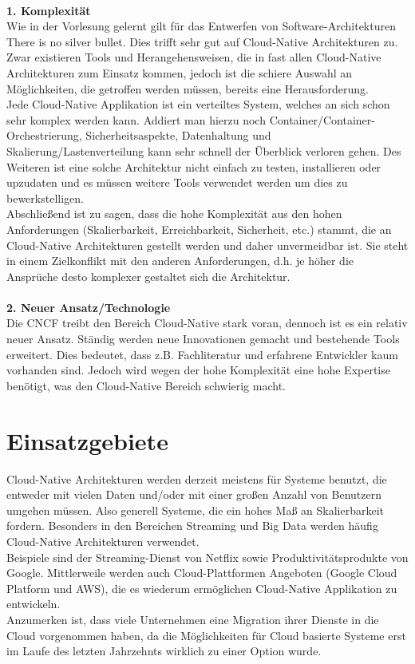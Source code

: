 \\
\textbf{1. Komplexität}\\
Wie in der Vorlesung gelernt gilt für das Entwerfen von Software-Architekturen \glqq There is no silver bullet\grqq{}. Dies trifft sehr gut auf Cloud-Native Architekturen zu. Zwar existieren Tools und Herangehensweisen, die in fast allen Cloud-Native Architekturen zum Einsatz kommen, jedoch ist die schiere Auswahl an Möglichkeiten, die getroffen werden müssen, bereits eine Herausforderung.\\ 
Jede Cloud-Native Applikation ist ein verteiltes System, welches an sich schon sehr komplex werden kann. Addiert man hierzu noch Container/Container-Orchestrierung, Sicherheitsaspekte, Datenhaltung und Skalierung/Lastenverteilung kann sehr schnell der Überblick verloren gehen. Des Weiteren ist eine solche Architektur nicht einfach zu testen, installieren oder upzudaten und es müssen weitere Tools verwendet werden um dies zu bewerkstelligen.\\
Abschließend ist zu sagen, dass die hohe Komplexität aus den hohen Anforderungen (Skalierbarkeit, Erreichbarkeit, Sicherheit, etc.) stammt, die an Cloud-Native Architekturen gestellt werden und daher unvermeidbar ist. Sie steht in einem Zielkonflikt mit den anderen Anforderungen, d.h. je höher die Ansprüche desto komplexer gestaltet sich die Architektur.\\
\\
\textbf{2. Neuer Ansatz/Technologie}\\
Die CNCF treibt den Bereich Cloud-Native stark voran, dennoch ist es ein relativ neuer Ansatz. Ständig werden neue Innovationen gemacht und bestehende Tools erweitert. Dies bedeutet, dass z.B. Fachliteratur und erfahrene Entwickler kaum vorhanden sind. Jedoch wird wegen der hohe Komplexität eine hohe Expertise benötigt, was den Cloud-Native Bereich schwierig macht. \cite{Top7}

\section{Einsatzgebiete}
Cloud-Native Architekturen werden derzeit meistens für Systeme benutzt, die entweder mit vielen Daten und/oder mit einer großen Anzahl von Benutzern umgehen müssen. Also generell Systeme, die ein hohes Maß an Skalierbarkeit fordern. Besonders in den Bereichen Streaming und Big Data werden häufig Cloud-Native Architekturen verwendet.\\ 
Beispiele sind der Streaming-Dienst von Netflix sowie Produktivitätsprodukte von Google. Mittlerweile werden auch Cloud-Plattformen Angeboten (Google Cloud Platform und \ac{AWS}), die es wiederum ermöglichen Cloud-Native Applikation zu entwickeln.\\
Anzumerken ist, dass viele Unternehmen eine Migration ihrer Dienste in die Cloud vorgenommen haben, da die Möglichkeiten für Cloud basierte Systeme erst im Laufe des letzten Jahrzehnts wirklich zu einer Option wurde.